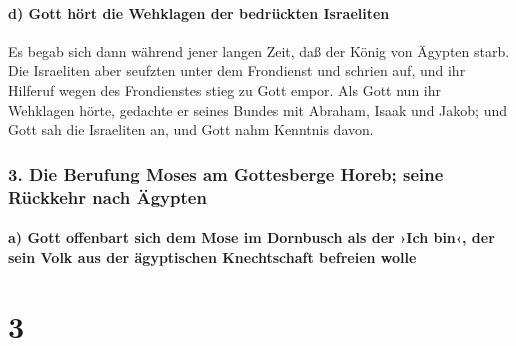 \hypertarget{d-gott-huxf6rt-die-wehklagen-der-bedruxfcckten-israeliten}{%
\paragraph{d) Gott hört die Wehklagen der bedrückten
Israeliten}\label{d-gott-huxf6rt-die-wehklagen-der-bedruxfcckten-israeliten}}

 Es begab sich dann während jener langen Zeit, daß der
König von Ägypten starb. Die Israeliten aber seufzten unter dem
Frondienst und schrien auf, und ihr Hilferuf wegen des Frondienstes
stieg zu Gott empor.  Als Gott nun ihr Wehklagen hörte,
gedachte er seines Bundes mit Abraham, Isaak und Jakob; 
und Gott sah die Israeliten an, und Gott nahm Kenntnis davon.

\hypertarget{die-berufung-moses-am-gottesberge-horeb-seine-ruxfcckkehr-nach-uxe4gypten}{%
\subsubsection{3. Die Berufung Moses am Gottesberge Horeb; seine
Rückkehr nach
Ägypten}\label{die-berufung-moses-am-gottesberge-horeb-seine-ruxfcckkehr-nach-uxe4gypten}}

\hypertarget{a-gott-offenbart-sich-dem-mose-im-dornbusch-als-der-ich-bin-der-sein-volk-aus-der-uxe4gyptischen-knechtschaft-befreien-wolle}{%
\paragraph{a) Gott offenbart sich dem Mose im Dornbusch als der ›Ich
bin‹, der sein Volk aus der ägyptischen Knechtschaft befreien
wolle}\label{a-gott-offenbart-sich-dem-mose-im-dornbusch-als-der-ich-bin-der-sein-volk-aus-der-uxe4gyptischen-knechtschaft-befreien-wolle}}

\hypertarget{section-2}{%
\section{3}\label{section-2}}

